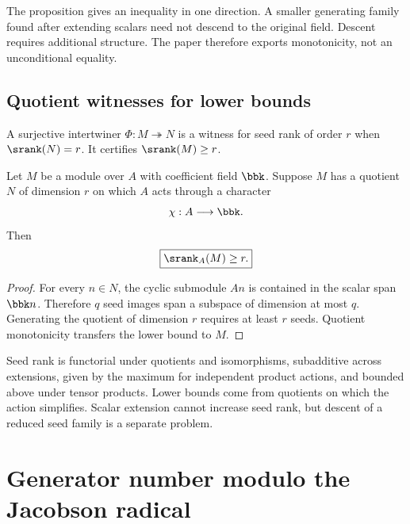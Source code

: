 \begin{hypothesisguide}
The proposition gives an inequality in one direction.  A smaller generating family found after extending scalars need not descend to the original field.  Descent requires additional structure.  The paper therefore exports monotonicity, not an unconditional equality.
\end{hypothesisguide}


\subsection{Quotient witnesses for lower bounds}
\begin{definition}
\label{def:seed-rank-witness}
A surjective intertwiner $\Phi:M\twoheadrightarrow N$ is a witness for seed rank of order $r$ when $\srank(N)=r$.  It certifies $\srank(M)\geq r$.
\end{definition}

\begin{proposition}
\label{prop:scalar-quotient}
Let $M$ be a module over $A$ with coefficient field $\bbk$.  Suppose $M$ has a quotient $N$ of dimension $r$ on which $A$ acts through a character
\[
\chi:A\longrightarrow\bbk.
\]
Then
\[
\boxed{\srank_A(M)\geq r.}
\]
\end{proposition}

\begin{proof}
For every $n\in N$, the cyclic submodule $An$ is contained in the scalar span $\bbk n$.  Therefore $q$ seed images span a subspace of dimension at most $q$.  Generating the quotient of dimension $r$ requires at least $r$ seeds.  Quotient monotonicity transfers the lower bound to $M$.
\end{proof}

\begin{sectionrecap}
Seed rank is functorial under quotients and isomorphisms, subadditive across extensions, given by the maximum for independent product actions, and bounded above under tensor products.  Lower bounds come from quotients on which the action simplifies.  Scalar extension cannot increase seed rank, but descent of a reduced seed family is a separate problem.
\end{sectionrecap}

\section{Generator number modulo the Jacobson radical}




